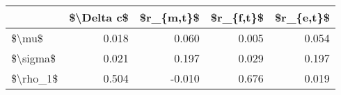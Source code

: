 \begin{tabular}{lrrrr}
\toprule
{} &  \$\textbackslash Delta c\$ &  \$r\_\{m,t\}\$ &  \$r\_\{f,t\}\$ &  \$r\_\{e,t\}\$ \\
\midrule
\$\textbackslash mu\$    &       0.018 &      0.060 &      0.005 &      0.054 \\
\$\textbackslash sigma\$ &       0.021 &      0.197 &      0.029 &      0.197 \\
\$\textbackslash rho\_1\$ &       0.504 &     -0.010 &      0.676 &      0.019 \\
\bottomrule
\end{tabular}

